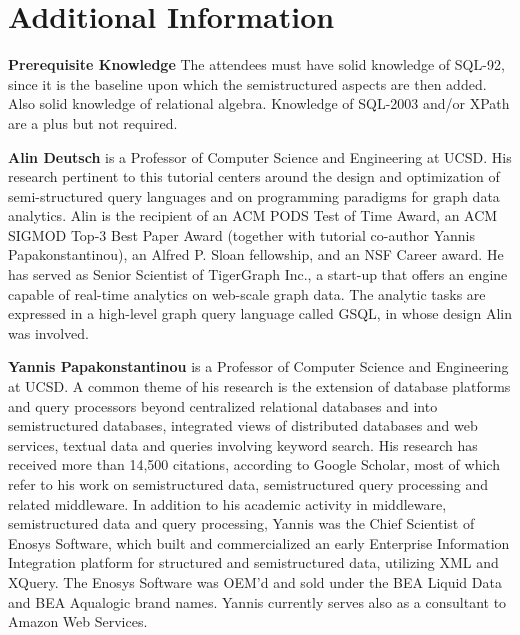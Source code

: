 

\section{Additional Information}
\label{sec:duration}

\noindent \textbf{Prerequisite Knowledge} 
\label{sec:audience}
The attendees must have solid knowledge of SQL-92, since it is the baseline upon which the semistructured aspects are then added. Also solid knowledge of relational algebra. Knowledge of SQL-2003 and/or XPath are a plus but not required.

\noindent \textbf{Alin Deutsch} is a Professor of Computer Science and Engineering at UCSD. His research pertinent to this tutorial centers around the design and optimization of semi-structured query languages
and on programming paradigms for graph data analytics. Alin is the recipient of an ACM PODS Test of Time Award, an ACM SIGMOD Top-3 Best Paper Award (together with tutorial co-author Yannis Papakonstantinou), an Alfred P. Sloan fellowship, and an NSF Career award.
He has served as Senior Scientist of TigerGraph Inc., a start-up that offers an engine capable of real-time analytics on web-scale graph data.
The analytic tasks are  expressed in a high-level graph query language called GSQL, in whose design Alin was involved.

\noindent \textbf{Yannis Papakonstantinou} is a Professor of Computer Science and Engineering at UCSD. A common theme of his research is the extension of database platforms and query processors beyond centralized relational databases and into semistructured databases, integrated views of distributed databases and web services, textual data and queries involving keyword search. His research has received more than 14,500 citations, according to Google Scholar, most of which refer to his work on semistructured data, semistructured query processing and related middleware.
In addition to his academic activity in middleware, semistructured data and query processing, Yannis was the Chief Scientist of Enosys Software, which built and commercialized an early Enterprise Information Integration platform for structured and semistructured data, utilizing XML and XQuery. The Enosys Software was OEM'd and sold under the BEA Liquid Data and BEA Aqualogic brand names. Yannis currently serves also as a consultant to Amazon Web Services.

